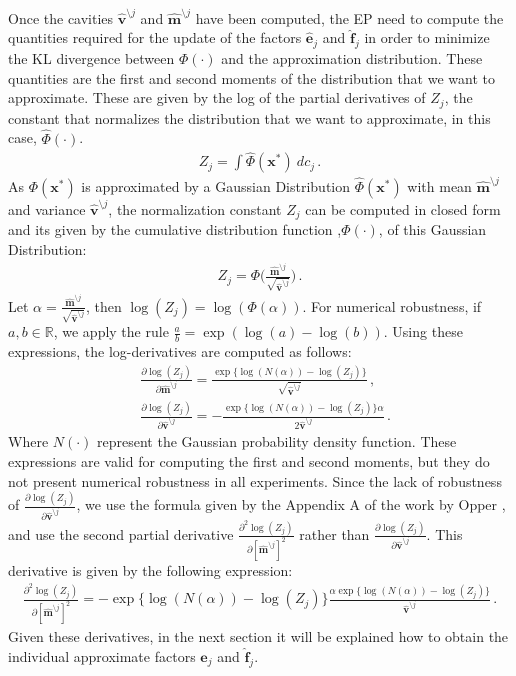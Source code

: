 Once the cavities $\boldsymbol{\hat{v}}^{\setminus j}$ and $\boldsymbol{\hat{m}}^{\setminus j}$ have been computed, the EP need to compute the quantities required for the update of the factors $\boldsymbol{\hat{e}}_{j}$ and $\boldsymbol{\hat{f}}_{j}$ in order to minimize the KL divergence between $\Phi(\cdot)$ and the approximation distribution. These quantities are the first and second moments of the distribution that we want to approximate. These are given by the log of the partial derivatives of $Z_j$, the constant that normalizes the distribution that we want to approximate, in this case, $\hat{\Phi}(\cdot)$.
\begin{align}
Z_j = \int \hat{\Phi}(\boldsymbol{x}^*)\ dc_j\,.
\end{align}
As $\Phi(\boldsymbol{x}^*)$ is approximated by a Gaussian Distribution $\hat{\Phi}(\boldsymbol{x}^*)$ with mean $\boldsymbol{\hat{m}}^{\setminus j}$ and variance $\boldsymbol{\hat{v}}^{\setminus j}$, the normalization constant $Z_j$ can be computed in closed form and its given by the cumulative distribution function ,$\Phi(\cdot)$, of this Gaussian Distribution:
\begin{align}
Z_j = \Phi\Bigg(\frac{\boldsymbol{\hat{m}}^{\setminus j}}{\sqrt{\boldsymbol{\hat{v}}^{\setminus j}}}\Bigg)\,.
\end{align}
Let $\alpha =  \frac{\boldsymbol{\hat{m}}^{\setminus j}}{\sqrt{\boldsymbol{\hat{v}}^{\setminus j}}}$, then $\log(Z_j) = \log(\Phi(\alpha))$. For numerical robustness, if $a,b \in \mathbb{R}$, we apply the rule $ \frac{a}{b} = \exp{(\log(a)-\log(b))}$. Using these expressions, the log-derivatives are computed as follows:
\begin{align}
& \frac{\partial \log(Z_j)}{\partial \boldsymbol{\hat{m}}^{\setminus j}} = \frac{\exp\{\log(N(\alpha))-\log(Z_j)\}}{\sqrt{\boldsymbol{\hat{v}}^{\setminus j}}}\,, \nonumber \\
& \frac{\partial \log(Z_j)}{\partial \boldsymbol{\hat{v}}^{\setminus j}} = - \frac{\exp\{\log(N(\alpha))-\log(Z_j)\}\alpha}{2\boldsymbol{\hat{v}}^{\setminus j}}\,.
\end{align}
Where $N(\cdot)$ represent the Gaussian probability density function. These expressions are valid for computing the first and second moments, but they do not present numerical robustness in all experiments. Since the lack of robustness of $\frac{\partial \log(Z_j)}{\partial \boldsymbol{\hat{v}}^{\setminus j}}$, we use the formula given by the Appendix A of the work by Opper \cite{opper2009variational}, and use the second partial derivative $\frac{\partial^{2} \log(Z_j)}{\partial [\boldsymbol{\hat{m}}^{\setminus j}]^2}$ rather than $\frac{\partial \log(Z_j)}{\partial \boldsymbol{\hat{v}}^{\setminus j}}$. This derivative is given by the following expression:
\begin{align}
\frac{\partial^{2} \log(Z_j)}{\partial [\boldsymbol{\hat{m}}^{\setminus j}]^2} = - \exp\{\log(N(\alpha))-\log(Z_j)\}\frac{\alpha\exp\{\log(N(\alpha))-\log(Z_j)\}}{\boldsymbol{\hat{v}}^{\setminus j}}\,.
\end{align}
Given these derivatives, in the next section it will be explained how to obtain the individual approximate factors $\boldsymbol{\hat{e}}_{j}$ and $\boldsymbol{\hat{f}}_{j}$.

